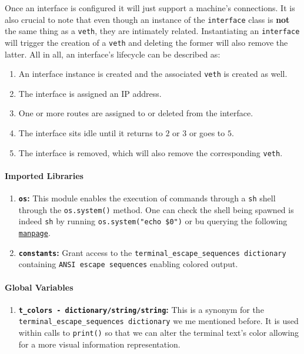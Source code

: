                 Once an interface is configured it will just support a machine's connections. It is also crucial to note that even though an instance of the \texttt{interface} class is \textbf{not} the same thing as a \texttt{veth}, they are intimately related. Instantiating an \texttt{interface} will trigger the creation of a \texttt{veth} and deleting the former will also remove the latter. All in all, an interface's lifecycle can be described as:\\

                \begin{enumerate}
                    \item An interface instance is created and the associated \texttt{veth} is created as well.
                    \item The interface is assigned an IP address.
                    \item One or more routes are assigned to or deleted from the interface.
                    \item The interface sits idle until it returns to $2$ or $3$ or goes to $5$.
                    \item The interface is removed, which will also remove the corresponding \texttt{veth}.
                \end{enumerate}

                \paragraph{Imported Libraries}
                    \begin{enumerate}
                        \item \textbf{\texttt{os}:} This module enables the execution of commands through a \texttt{sh} shell through the \texttt{os.system()} method. One can check the shell being spawned is indeed \texttt{sh} by running \texttt{\allowbreak os.system("echo \$0")} or bu querying the following \href{https://linux.die.net/man/3/system}{\texttt{manpage}}.
                        \item \textbf{\texttt{constants}:} Grant access to the \texttt{\allowbreak terminal\_escape\_sequences dictionary} containing \texttt{ANSI escape sequences} enabling colored output.
                    \end{enumerate}

                \paragraph{Global Variables}
                    \begin{enumerate}
                        \item \textbf{\texttt{\allowbreak t\_colors - dictionary/string/string}:} This is a synonym for the \texttt{\allowbreak terminal\_escape\_sequences dictionary} we me mentioned before. It is used within calls to \texttt{print()} so that we can alter the terminal text's color allowing for a more visual information representation.
                    \end{enumerate}

